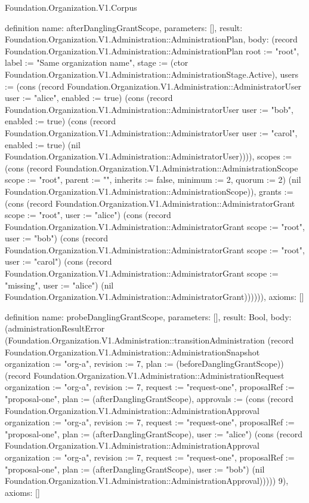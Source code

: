 \begin{lexlean}{Foundation.Organization.V1.Corpus}
\begin{semanticmodule}
definition{
  name: afterDanglingGrantScope,
  parameters: [],
  result: Foundation.Organization.V1.Administration::AdministrationPlan,
  body: (record Foundation.Organization.V1.Administration::AdministrationPlan {root := "root", label := "Same organization name", stage := (ctor Foundation.Organization.V1.Administration::AdministrationStage.Active), users := (cons (record Foundation.Organization.V1.Administration::AdministratorUser {user := "alice", enabled := true}) (cons (record Foundation.Organization.V1.Administration::AdministratorUser {user := "bob", enabled := true}) (cons (record Foundation.Organization.V1.Administration::AdministratorUser {user := "carol", enabled := true}) (nil Foundation.Organization.V1.Administration::AdministratorUser)))), scopes := (cons (record Foundation.Organization.V1.Administration::AdministrationScope {scope := "root", parent := "", inherits := false, minimum := 2, quorum := 2}) (nil Foundation.Organization.V1.Administration::AdministrationScope)), grants := (cons (record Foundation.Organization.V1.Administration::AdministratorGrant {scope := "root", user := "alice"}) (cons (record Foundation.Organization.V1.Administration::AdministratorGrant {scope := "root", user := "bob"}) (cons (record Foundation.Organization.V1.Administration::AdministratorGrant {scope := "root", user := "carol"}) (cons (record Foundation.Organization.V1.Administration::AdministratorGrant {scope := "missing", user := "alice"}) (nil Foundation.Organization.V1.Administration::AdministratorGrant)))))}),
  axioms: []
}

definition{
  name: probeDanglingGrantScope,
  parameters: [],
  result: Bool,
  body: (administrationResultError (Foundation.Organization.V1.Administration::transitionAdministration (record Foundation.Organization.V1.Administration::AdministrationSnapshot {organization := "org-a", revision := 7, plan := (beforeDanglingGrantScope)}) (record Foundation.Organization.V1.Administration::AdministrationRequest {organization := "org-a", revision := 7, request := "request-one", proposalRef := "proposal-one", plan := (afterDanglingGrantScope), approvals := (cons (record Foundation.Organization.V1.Administration::AdministrationApproval {organization := "org-a", revision := 7, request := "request-one", proposalRef := "proposal-one", plan := (afterDanglingGrantScope), user := "alice"}) (cons (record Foundation.Organization.V1.Administration::AdministrationApproval {organization := "org-a", revision := 7, request := "request-one", proposalRef := "proposal-one", plan := (afterDanglingGrantScope), user := "bob"}) (nil Foundation.Organization.V1.Administration::AdministrationApproval)))})) 9),
  axioms: []
}


\end{semanticmodule}
\end{lexlean}
